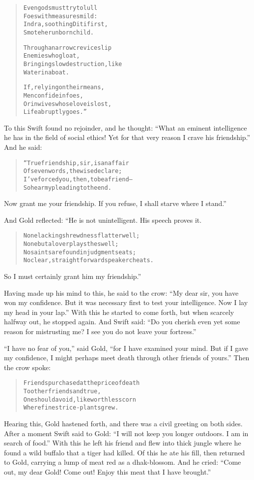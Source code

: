 \documentclass[article, twoside, 14pt]{memoir}
\renewenvironment{verbatim}{%
\begin{quote}%
\vskip -10pt%
\begin{alltt}\normalfont\large}{\end{alltt}%
\end{quote}%
\vskip -10pt
} %
\begin{document}
\begin{verbatim}
Even gods must try to lull
    Foes with measures mild:
Indra, soothing Diti first,
    Smote her unborn child.

Through a narrow crevice slip
    Enemies who gloat,
Bringing slow destruction, like
    Water in a boat.

If, relying on their means,
    Men confide in foes,
Or in wives whose love is lost,
    Life abruptly goes.”
\end{verbatim}
To this Swift found no rejoinder, and he thought:
``What an eminent intelligence he has in the field of social ethics! Yet for that very reason I crave his friendship.''
And he said:

\begin{verbatim}
“True friendship, sir, is an affair
Of seven words, the wise declare;
I've forced you, then, to be a friend--
So hear my pleading to the end.
\end{verbatim}
Now grant me your friendship. If you refuse, I shall starve where I
stand.”

And Gold reflected: “He is not unintelligent. His speech proves
it.

\begin{verbatim}
None lacking shrewdness flatter well;
None but a lover plays the swell;
No saints are found in judgment seats;
No clear, straightforward speaker cheats.
\end{verbatim}
So I must certainly grant him my friendship.”

Having made up his mind to this, he said to the crow:
``My dear sir, you have won my confidence. But it was necessary first to test your intelligence. Now I lay my head in your lap.''
With this he started to come forth, but when scarcely halfway out,
he stopped again. And Swift said:
``Do you cherish even yet some reason for mistrusting me? I see you do not leave your fortress.''

``I have no fear of you,'' said Gold,
``for I have examined your mind. But if I gave my confidence, I might perhaps meet death through other friends of yours.''
Then the crow spoke:

\begin{verbatim}
Friends purchased at the price of death
    To other friends and true,
One should avoid, like worthless corn
    Where finest rice-plants grew.
\end{verbatim}
Hearing this, Gold hastened forth, and there was a civil greeting
on both sides. After a moment Swift said to Gold:
``I will not keep you longer outdoors. I am in search of food.''
With this he left his friend and flew into thick jungle where he
found a wild buffalo that a tiger had killed. Of this he ate his
fill, then returned to Gold, carrying a lump of meat red as a
dhak-blossom. And he cried:
``Come out, my dear Gold! Come out! Enjoy this meat that I have brought.''
\end{document}
